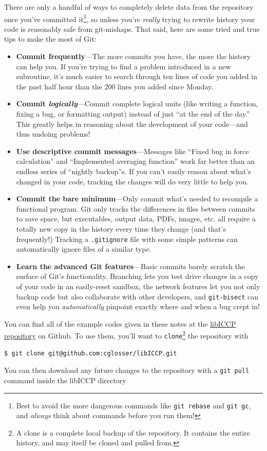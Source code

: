\documentclass[openany,oneside]{report}
\begin{document}
There are only a handful of ways to completely delete data from the repository once you've committed it\footnote{Best to avoid the more dangerous commands like \texttt{git rebase} and \texttt{git gc}, and \emph{always} think about commands before you run them!}, so unless you're \emph{really} trying to rewrite history your code is reasonably safe from git-mishaps.
That said, here are some tried and true tips to make the most of Git:
\begin{itemize}
  \item \textbf{Commit frequently}---The more commits you have, the more the history can help you.
    If you're trying to find a problem introduced in a new subroutine, it's much easier to search through ten lines of code you added in the past half hour than the 200 lines you added since Monday.
  \item \textbf{Commit \emph{logically}}---Commit complete logical units (like writing a function, fixing a bug, or formatting output) instead of just ``at the end of the day.''
    This greatly helps in reasoning about the development of your code---and thus undoing problems!
  \item \textbf{Use descriptive commit messages}---Messages like ``Fixed bug in force calculation'' and ``Implemented averaging function'' work far better than an endless series of ``nightly backup''s.
    If you can't easily reason about what's changed in your code, tracking the changes will do very little to help you.
  \item \textbf{Commit the bare minimum}---Only commit what's needed to recompile a functional program.
    Git only tracks the differences in files between commits to save space, but executables, output data, PDFs, images, etc. all require a totally new copy in the history every time they change (and that's frequently!)
    Tracking a \texttt{.gitignore} file with some simple patterns can automatically ignore files of a similar type.
  \item \textbf{Learn the advanced Git features}---Basic commits barely scratch the surface of Git's functionality.
    Branching lets you test drive changes in a copy of your code in an easily-reset sandbox, the network features let you not only backup code but also collaborate with other developers, and \texttt{git-bisect} can even help you \emph{automatically} pinpoint exactly where and when a bug crept in!
\end{itemize}

You can find all of the example codes given in these notes at the \href{https://Github.com/cglosser/libICCP}{libICCP repository} on Github.
To use them, you'll want to \texttt{clone}\footnote{A clone is a complete local backup of the repository. It contains the entire history, and may itself be cloned and pulled from.} the repository with
\begin{verbatim}
$ git clone git@github.com:cglosser/libICCP.git
\end{verbatim}
You can then download any future changes to the repository with a \texttt{git pull} command inside the libICCP directory 
\end{document}
